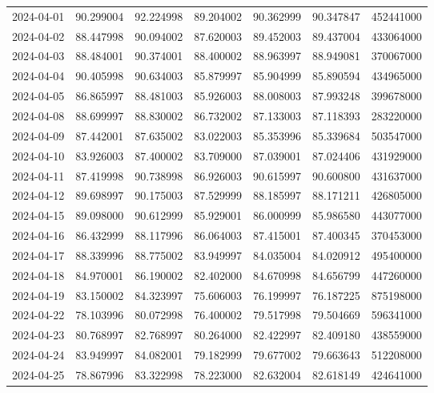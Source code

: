 \begin{tabular}{lrrrrrr}
2024-04-01 &   90.299004 &   92.224998 &   89.204002 &   90.362999 &   90.347847 &   452441000 \\
2024-04-02 &   88.447998 &   90.094002 &   87.620003 &   89.452003 &   89.437004 &   433064000 \\
2024-04-03 &   88.484001 &   90.374001 &   88.400002 &   88.963997 &   88.949081 &   370067000 \\
2024-04-04 &   90.405998 &   90.634003 &   85.879997 &   85.904999 &   85.890594 &   434965000 \\
2024-04-05 &   86.865997 &   88.481003 &   85.926003 &   88.008003 &   87.993248 &   399678000 \\
2024-04-08 &   88.699997 &   88.830002 &   86.732002 &   87.133003 &   87.118393 &   283220000 \\
2024-04-09 &   87.442001 &   87.635002 &   83.022003 &   85.353996 &   85.339684 &   503547000 \\
2024-04-10 &   83.926003 &   87.400002 &   83.709000 &   87.039001 &   87.024406 &   431929000 \\
2024-04-11 &   87.419998 &   90.738998 &   86.926003 &   90.615997 &   90.600800 &   431637000 \\
2024-04-12 &   89.698997 &   90.175003 &   87.529999 &   88.185997 &   88.171211 &   426805000 \\
2024-04-15 &   89.098000 &   90.612999 &   85.929001 &   86.000999 &   85.986580 &   443077000 \\
2024-04-16 &   86.432999 &   88.117996 &   86.064003 &   87.415001 &   87.400345 &   370453000 \\
2024-04-17 &   88.339996 &   88.775002 &   83.949997 &   84.035004 &   84.020912 &   495400000 \\
2024-04-18 &   84.970001 &   86.190002 &   82.402000 &   84.670998 &   84.656799 &   447260000 \\
2024-04-19 &   83.150002 &   84.323997 &   75.606003 &   76.199997 &   76.187225 &   875198000 \\
2024-04-22 &   78.103996 &   80.072998 &   76.400002 &   79.517998 &   79.504669 &   596341000 \\
2024-04-23 &   80.768997 &   82.768997 &   80.264000 &   82.422997 &   82.409180 &   438559000 \\
2024-04-24 &   83.949997 &   84.082001 &   79.182999 &   79.677002 &   79.663643 &   512208000 \\
2024-04-25 &   78.867996 &   83.322998 &   78.223000 &   82.632004 &   82.618149 &   424641000 \\

\end{tabular}

